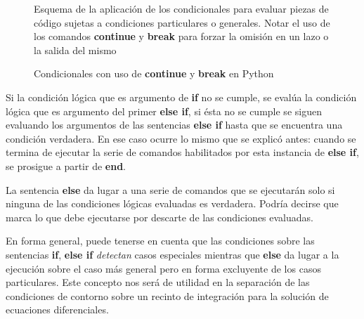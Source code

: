 \begin{figure}
  
  \caption{Esquema de la aplicación de los condicionales   para 
  evaluar piezas de código sujetas a condiciones 
  particulares o generales. Notar el uso de los comandos 
  \protect\textbf{continue} y \protect\textbf{break} para forzar la 
  omisión en un lazo o la salida del mismo
  \label{FigMatlabIf}
  }

\end{figure}

\begin{figure}
  
  \caption{Condicionales con uso de 
  \protect\textbf{continue} y \protect\textbf{break}
  en Python
  \label{FigPythonf}
  }

\end{figure}
Si la condición lógica que es argumento de \textbf{if}
no se cumple, se evalúa 
la condición lógica que es argumento del 
primer \textbf{else if}, si ésta no se cumple 
se siguen evaluando los argumentos de las
sentencias \textbf{else if} hasta que se encuentra 
una condición verdadera. En ese caso ocurre lo 
mismo que se explicó antes: cuando se termina
de ejecutar la serie de comandos habilitados
por esta instancia de \textbf{else if}, se
prosigue a partir de \textbf{end}.

La sentencia \textbf{else} da lugar a una serie de
comandos que se ejecutarán solo si ninguna de las 
condiciones lógicas evaluadas es verdadera. 
Podría decirse que marca lo que debe ejecutarse por 
descarte de las condiciones evaluadas. 

En forma general, puede tenerse en cuenta que las 
condiciones sobre las sentencias \textbf{if}, 
\textbf{else if} \emph{ detectan} casos especiales
mientras que \textbf{else} da lugar a la ejecución
sobre el caso más general pero en forma 
excluyente de los casos particulares. Este 
concepto nos será de utilidad en la separación
de las condiciones de contorno sobre un 
recinto de integración para la solución
de ecuaciones diferenciales. 

\mode*

